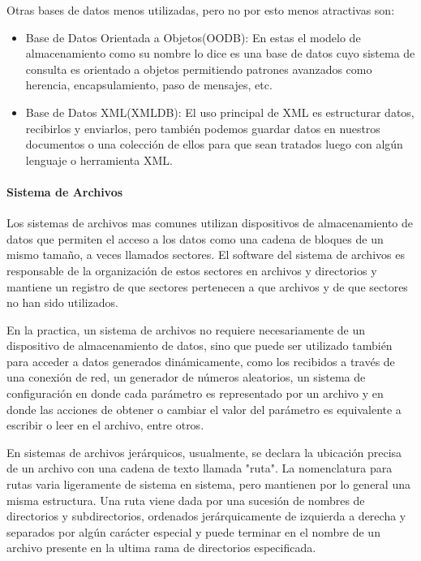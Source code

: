 Otras bases de datos menos utilizadas, pero no por esto menos atractivas son:

\begin{itemize}

	\item Base de Datos Orientada a Objetos(OODB): En estas el modelo de almacenamiento como su nombre lo dice es una base de datos cuyo sistema de consulta es orientado a objetos permitiendo patrones avanzados como herencia, encapsulamiento, paso de mensajes, etc.
	
	\item Base de Datos XML(XMLDB): El uso principal de XML es estructurar datos, recibirlos y enviarlos, pero también podemos guardar datos en nuestros documentos o una colección de ellos para que sean tratados luego con algún lenguaje o herramienta XML.

\end{itemize}


\paragraph{Sistema de Archivos}

Los sistemas de archivos mas comunes utilizan dispositivos de almacenamiento de datos que permiten el acceso a los datos como una cadena de bloques de un mismo tamaño, a veces llamados sectores. El software del sistema de archivos es responsable de la organización de estos sectores en archivos y directorios y mantiene un registro de que sectores pertenecen a que archivos y de que sectores no han sido utilizados.

En la practica, un sistema de archivos no requiere necesariamente de un dispositivo de almacenamiento de datos, sino que puede ser utilizado también para acceder a datos generados dinámicamente, como los recibidos a través de una conexión de red, un generador de números aleatorios, un sistema de configuración en donde cada parámetro es representado por un archivo y en donde las acciones de obtener o cambiar el valor del parámetro es equivalente a escribir o leer en el archivo, entre otros.

En sistemas de archivos jerárquicos, usualmente, se declara la ubicación precisa de un archivo con una cadena de texto llamada "ruta". La nomenclatura para rutas varia ligeramente de sistema en sistema, pero mantienen por lo general una misma estructura. Una ruta viene dada por una sucesión de nombres de directorios y subdirectorios, ordenados jerárquicamente de izquierda a derecha y separados por algún carácter especial y puede terminar en el nombre de un archivo presente en la ultima rama de directorios especificada.


